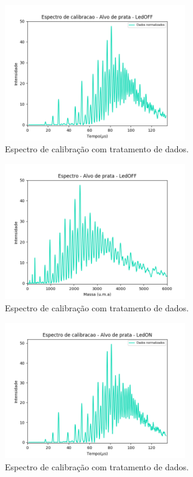 \begin{figure}
  \centering  
  \includegraphics[width=0.7\textwidth]{exp_03/LEDOFF_normalizado_mcp.png}
  \caption{Espectro de calibração com tratamento de dados.}
  \label{fig:03_ledoff_dados_tratados} 
\end{figure}

\begin{figure}
  \centering  
  \includegraphics[width=0.7\textwidth]{exp_03/LEDOFF_espec_calib_ag_massa.png}
  \caption{Espectro de calibração com tratamento de dados.}
  \label{fig:03_ledoff_massa} 
\end{figure}



\begin{figure}
  \centering  
  \includegraphics[width=0.7\textwidth]{exp_03/LEDON_normalizado_mcp.png}
  \caption{Espectro de calibração com tratamento de dados.}
  \label{fig:03_ledon_dados_tratados} 
\end{figure}

